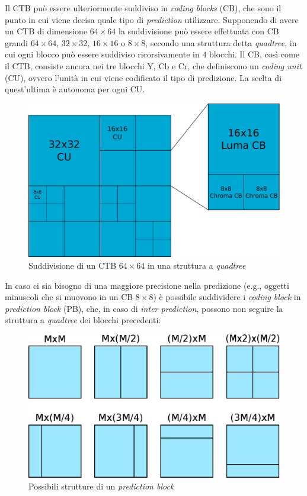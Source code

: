 Il CTB può essere ulteriormente suddiviso in \emph{coding blocks} (CB), che 
sono il punto in cui viene decisa quale tipo di \emph{prediction} utilizzare.
Supponendo di avere un CTB di dimensione $64{\times}64$ la suddivisione può 
essere 
effettuata con CB grandi $64{\times}64$, $32{\times}32$, $16{\times}16$ o 
$8{\times}8$, secondo una struttura detta \emph{quadtree}, in cui ogni blocco 
può essere suddiviso ricorsivamente in $4$ blocchi.
Il CB, così come il CTB, consiste ancora nei tre blocchi Y, Cb e 
Cr, che definiscono un \emph{coding unit} (CU), ovvero l'unità in cui viene 
codificato il tipo di predizione. La scelta di quest'ultima è autonoma per ogni 
CU.
\begin{figure}[H]
  \centering
  \includegraphics[scale=0.50]{Figures/CTB-CU-CB}
  \caption[Suddivisione del CTB in CU]{Suddivisione di un CTB $64{\times}64$ in 
  una 
struttura a \emph{quadtree}}
\end{figure}
In caso ci sia bisogno di una maggiore precisione nella predizione (e.g., 
oggetti minuscoli che si muovono in un CB $8{\times}8$) è possibile suddividere
i \emph{coding block} in \emph{prediction block} (PB), che, in caso di 
\emph{inter prediction}, possono non seguire la struttura a \emph{quadtree} dei
blocchi precedenti:
\begin{figure}[H]
  \centering
  \includegraphics[scale=0.75]{Figures/PB}
  \caption{Possibili strutture di un \emph{prediction block}}
\end{figure}
